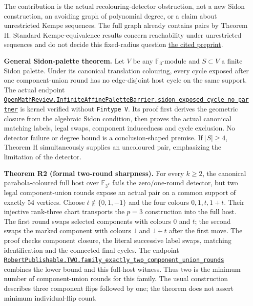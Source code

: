 \documentclass[
  11pt,
]{article}
\begin{document}
The contribution is the actual recolouring-detector obstruction, not a
new Sidon construction, an avoiding graph of polynomial degree, or a
claim about unrestricted Kempe sequences. The full graph already
contains pairs by Theorem H. Standard Kempe-equivalence results concern
reachability under unrestricted sequences and do not decide this
fixed-radius question \href{https://arxiv.org/abs/2105.01363}{the cited
preprint}.

\textbf{General Sidon-palette theorem.} Let \(V\) be any
\(\mathbb F_3\)-module and \(S\subset V\) a finite Sidon palette. Under
its canonical translation colouring, every cycle exposed after one
component-union round has no edge-disjoint host cycle on the same
support. The actual endpoint
\href{https://github.com/alejandrozu/openmath-2026-judging/blob/70c5ec3107658182f22c207d4c50f53f9cb3e602/robert-review-2026-10-07/lean/InfiniteAffinePaletteBarrier.lean\#L54}{\texttt{OpenMathReview.InfiniteAffinePaletteBarrier.sidon\_exposed\_cycle\_no\_partner}}
is kernel verified without \texttt{Fintype\ V}. Its proof first derives
the geometric closure from the algebraic Sidon condition, then proves
the actual canonical matching labels, legal swaps, component inducedness
and cycle exclusion. No detector failure or degree bound is a
conclusion-shaped premise. If \(|S|\geq4\), Theorem H simultaneously
supplies an uncoloured pair, emphasizing the limitation of the detector.

\textbf{Theorem R2 (formal two-round sharpness).} For every \(k\geq2\),
the canonical parabola-coloured full host over \(\mathbb F_{3^k}\) fails
the zero/one-round detector, but two legal component-union rounds expose
an actual pair on a common support of exactly 54 vertices. Choose
\(t\notin\{0,1,-1\}\) and the four colours \(0,1,t,1+t\). Their
injective rank-three chart transports the \(p=3\) construction into the
full host. The first round swaps selected components with colours \(0\)
and \(t\); the second swaps the marked component with colours \(1\) and
\(1+t\) after the first move. The proof checks component closure, the
literal successive label swaps, matching identification and the
connected final cycles. The endpoint
\href{https://github.com/alejandrozu/openmath-2026-judging/blob/70c5ec3107658182f22c207d4c50f53f9cb3e602/robert-review-2026-10-07/lean/CycleComposition.lean\#L171}{\texttt{RobertPublishable.TWO.family\_exactly\_two\_component\_union\_rounds}}
combines the lower bound and this full-host witness. Thus two is the
minimum number of component-union rounds for this family. The usual
construction describes three component flips followed by one; the
theorem does not assert minimum individual-flip count.
\end{document}
